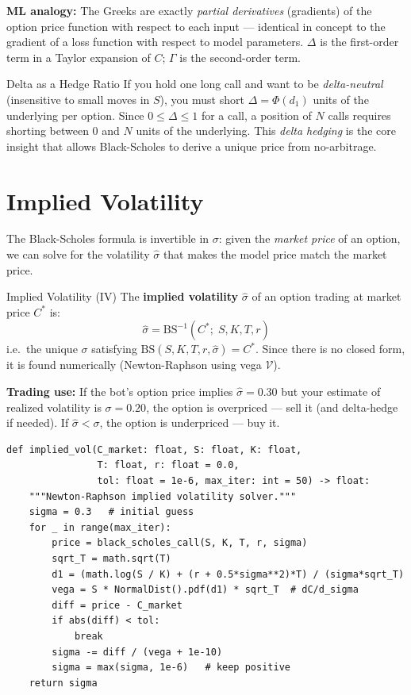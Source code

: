 \documentclass[12pt,a4paper,openany]{report}
\theoremstyle{definition}
\begin{document}
\textbf{ML analogy:} The Greeks are exactly \emph{partial derivatives} (gradients) of the option price function with respect to each input — identical in concept to the gradient of a loss function with respect to model parameters. $\Delta$ is the first-order term in a Taylor expansion of $C$; $\Gamma$ is the second-order term.

\begin{keyconceptbox}{Delta as a Hedge Ratio}
If you hold one long call and want to be \emph{delta-neutral} (insensitive to small moves in $S$), you must short $\Delta = \Phi(d_1)$ units of the underlying per option. Since $0 \leq \Delta \leq 1$ for a call, a position of $N$ calls requires shorting between 0 and $N$ units of the underlying. This \emph{delta hedging} is the core insight that allows Black-Scholes to derive a unique price from no-arbitrage.
\end{keyconceptbox}

\section{Implied Volatility}

The Black-Scholes formula is invertible in $\sigma$: given the \emph{market price} of an option, we can solve for the volatility $\hat{\sigma}$ that makes the model price match the market price.

\begin{definitionbox}{Implied Volatility (IV)}
The \textbf{implied volatility} $\hat{\sigma}$ of an option trading at market price $C^*$ is:
\[
  \hat{\sigma} = \text{BS}^{-1}(C^*;\; S, K, T, r)
\]
i.e.\ the unique $\sigma$ satisfying $\text{BS}(S, K, T, r, \hat{\sigma}) = C^*$.
Since there is no closed form, it is found numerically (Newton-Raphson using vega $\mathcal{V}$).
\end{definitionbox}

\textbf{Trading use:} If the bot's option price implies $\hat{\sigma} = 0.30$ but your estimate of realized volatility is $\sigma = 0.20$, the option is overpriced — sell it (and delta-hedge if needed). If $\hat{\sigma} < \sigma$, the option is underpriced — buy it.

\begin{lstlisting}
def implied_vol(C_market: float, S: float, K: float,
                T: float, r: float = 0.0,
                tol: float = 1e-6, max_iter: int = 50) -> float:
    """Newton-Raphson implied volatility solver."""
    sigma = 0.3   # initial guess
    for _ in range(max_iter):
        price = black_scholes_call(S, K, T, r, sigma)
        sqrt_T = math.sqrt(T)
        d1 = (math.log(S / K) + (r + 0.5*sigma**2)*T) / (sigma*sqrt_T)
        vega = S * NormalDist().pdf(d1) * sqrt_T  # dC/d_sigma
        diff = price - C_market
        if abs(diff) < tol:
            break
        sigma -= diff / (vega + 1e-10)
        sigma = max(sigma, 1e-6)   # keep positive
    return sigma
\end{lstlisting}
\end{document}
